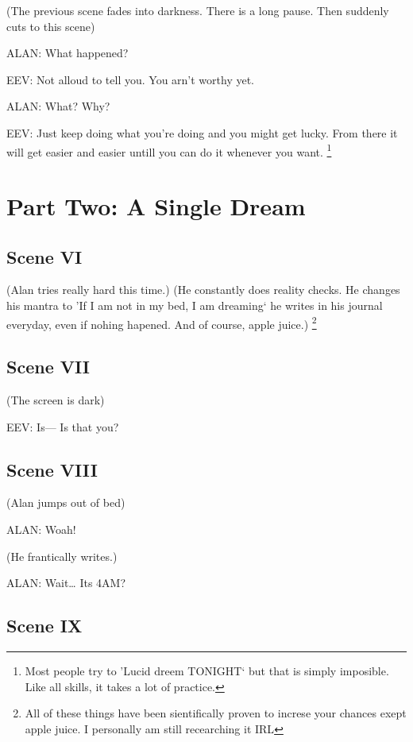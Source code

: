 \documentclass{article}
\begin{document}
(The previous scene fades into darkness. There is a long pause. Then suddenly cuts to this scene)

\noindent
ALAN: What happened?

\noindent
EEV: Not alloud to tell you. You arn't worthy yet.

\noindent
ALAN: What? Why?

\noindent
EEV: Just keep doing what you're doing and you might get lucky. From there it will get easier and easier untill you can do it whenever you want.
\footnote{Most people try to 'Lucid dreem TONIGHT` but that is simply imposible. Like all skills, it takes a lot of practice.}

\section{Part Two: A Single Dream}
\subsection[006 - VI]{Scene VI}

(Alan tries really hard this time.) (He constantly does reality checks. He changes his mantra to 'If I am not in my bed, I am dreaming`
he writes in his journal everyday, even if nohing hapened. And of course, apple juice.)
\footnote{All of these things have been sientifically proven to increse your chances exept apple juice. I personally
am still recearching it IRL}

\subsection[007 - VII]{Scene VII}

(The screen is dark)

\noindent
EEV: Is--- Is that you?

\subsection[008 - VIII]{Scene VIII}

(Alan jumps out of bed)

\noindent
ALAN: Woah!

\noindent
(He frantically writes.)

\noindent
ALAN: Wait\ldots{} Its 4AM?

\subsection[009 - IX]{Scene IX}
\end{document}
